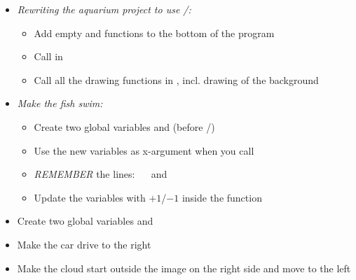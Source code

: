 \begin{exercisebox}[adjusted title= Aquarium continues]
\begin{itemize}
\item \emph{Rewriting the aquarium project to use /:}
 \begin{itemize}
 \item Add empty  and  functions to the bottom of the program
 \item Call  in 
 \item Call all the drawing functions in , incl. drawing of the background
 \end{itemize}

\item \emph{Make the fish swim:}
 \begin{itemize}
 \item Create two global variables  and
  (before /)
 \item Use the new variables as x-argument when you call 
 \item \emph{REMEMBER} the lines: ~~ and ~~
 \item Update the variables with $+1$/$-1$ inside the  function
 \end{itemize}
\end{itemize}
\end{exercisebox}

\begin{exercisebox}[adjusted title= Green City continues]

\begin{itemize}
\item Create two global variables  and 
\item Make the car drive to the right
\item Make the cloud start outside the image on the right side and move to the left
\end{itemize}
\end{exercisebox}


